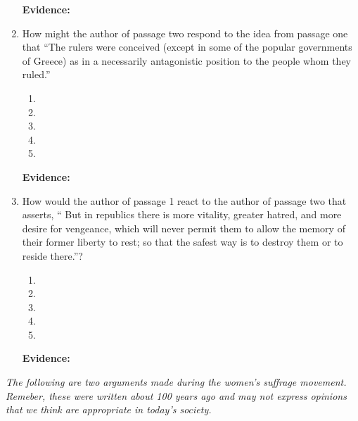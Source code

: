 \begin{enumerate}
\bigskip
\textbf{Evidence:} \hrulefill

\bigskip
\item How might the author of passage two respond to the idea from passage one that ``The rulers were conceived (except in some of the popular governments of Greece) as in a necessarily antagonistic position to the people whom they ruled.''

\bigskip
\begin{enumerate}[label=(\Alph*)]
\item 
\item
\item 
\item 
\item 
\end{enumerate}

\bigskip
\textbf{Evidence:} \hrulefill

\bigskip
\item How would the author of passage 1 react to the author of passage two that asserts, `` But in republics there is more vitality, greater hatred, and more desire for vengeance, which will never permit them to allow the memory of their former liberty to rest; so that the safest way is to destroy them or to reside there.''?

\bigskip
\begin{enumerate}[label=(\Alph*)]
\item 
\item
\item 
\item 
\item 
\end{enumerate}

\bigskip
\textbf{Evidence:} \hrulefill

\end{enumerate}

\bigskip
\textit{The following are two arguments made during the women's suffrage movement. Remeber, these were written about 100 years ago and may not express opinions that we think are appropriate in today's society.}

